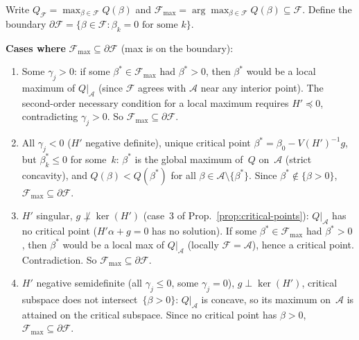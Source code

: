 \begin{proposition}%
\label{prop:boundary-vs-interior}
Write $Q_{\mathcal{F}} = \max_{\beta \in \mathcal{F}} Q(\beta)$
and $\mathcal{F}_{\max} = \arg\max_{\beta \in \mathcal{F}} Q(\beta)
\subseteq \mathcal{F}$.
Define the boundary
$\partial\mathcal{F} = \{\beta \in \mathcal{F} : \beta_k = 0
\text{ for some } k\}$.

\medskip\noindent
\textbf{Cases where}
$\mathcal{F}_{\max} \subseteq \partial\mathcal{F}$
(max is on the boundary):
\begin{enumerate}
  \item[(B1)] Some $\gamma_j > 0$:
    if some $\beta^* \in \mathcal{F}_{\max}$ had $\beta^* > 0$,
    then $\beta^*$ would be a local maximum of $Q|_{\mathcal{A}}$
    (since $\mathcal{F}$ agrees with $\mathcal{A}$ near any
    interior point).
    The second-order necessary condition for a local maximum
    requires $H' \preceq 0$, contradicting $\gamma_j > 0$.
    So $\mathcal{F}_{\max} \subseteq \partial\mathcal{F}$.

  \item[(B2)] All $\gamma_j < 0$ ($H'$ negative definite),
    unique critical point $\beta^* = \beta_0 - V(H')^{-1}g$,
    but $\beta^*_k \leq 0$ for some~$k$:
    $\beta^*$ is the global maximum of~$Q$ on~$\mathcal{A}$
    (strict concavity), and $Q(\beta) < Q(\beta^*)$ for all
    $\beta \in \mathcal{A} \setminus \{\beta^*\}$.
    Since $\beta^* \notin \{\beta > 0\}$,
    $\mathcal{F}_{\max} \subseteq \partial\mathcal{F}$.

  \item[(B3)] $H'$ singular, $g \not\perp \ker(H')$
    (case~3 of Prop.~\ref{prop:critical-points}):
    $Q|_{\mathcal{A}}$ has no critical point
    ($H'\alpha + g = 0$ has no solution).
    If some $\beta^* \in \mathcal{F}_{\max}$ had $\beta^* > 0$,
    then $\beta^*$ would be a local max of $Q|_{\mathcal{A}}$
    (locally $\mathcal{F} = \mathcal{A}$), hence a critical point.
    Contradiction.
    So $\mathcal{F}_{\max} \subseteq \partial\mathcal{F}$.

  \item[(B4)] $H'$ negative semidefinite (all $\gamma_j \leq 0$,
    some $\gamma_j = 0$), $g \perp \ker(H')$,
    critical subspace does not intersect~$\{\beta > 0\}$:
    $Q|_{\mathcal{A}}$ is concave, so its maximum on~$\mathcal{A}$
    is attained on the critical subspace.
    Since no critical point has $\beta > 0$,
    $\mathcal{F}_{\max} \subseteq \partial\mathcal{F}$.
\end{enumerate}


\end{proposition}
